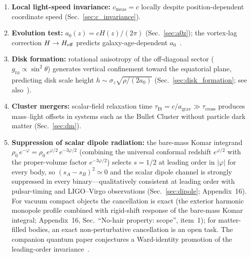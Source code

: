 \documentclass[aps,prd,onecolumn,superscriptaddress,nofootinbib,showpacs,12pt]{revtex4-2}
\newcommand{\azero}{a_{0}}
\begin{document}
\begin{enumerate}
\item \textbf{Local light-speed invariance:}
  $c_{\mathrm{meas}}=c$ locally despite
  position-dependent coordinate speed
  (Sec.~\ref{sec:c_invariance}).

\item \textbf{Evolution test:}
  $\azero(z)=cH(z)/(2\pi)$
  (Sec.~\ref{sec:a0z}); the vortex-lag correction
  $H\to H_{\rm eff}$ predicts galaxy-age-dependent
  $\azero$~\cite{Lotishvili2026MOND}.

\item \textbf{Disk formation:}
  rotational anisotropy of the off-diagonal sector
  ($g_{t\phi}\propto\sin^2\theta$)
  generates vertical confinement toward the equatorial plane,
  predicting disk scale height
  $h\sim\sigma_z\sqrt{\rho/(2\azero)}$
  (Sec.~\ref{sec:disk_formation}; see also~\cite{Lotishvili2026MOND}).

\item \textbf{Cluster mergers:}
  scalar-field relaxation time
  $\tau_{\mathrm{IS}}=c/a_{\mathrm{grav}}\gg\tau_{\mathrm{cross}}$
  produces mass--light offsets in systems such as the
  Bullet Cluster without particle dark matter
  (Sec.~\ref{sec:dm}).

\item \textbf{Suppression of scalar dipole radiation:}
  the bare-mass Komar integrand $\rho_0\,e^{-\varphi}
  = \rho_0\,e^{\varphi/2}\,e^{-3\varphi/2}$ (combining
  the universal conformal redshift $e^{\varphi/2}$ with
  the proper-volume factor $e^{-3\varphi/2}$) selects
  $s=1/2$ at leading order in $|\varphi|$ for every
  body, so $(s_A - s_B)^2 \simeq 0$ and the scalar
  dipole channel is strongly suppressed in every
  binary---qualitatively consistent at leading order with
  pulsar-timing and LIGO--Virgo observations
  (Sec.~\ref{sec:dipole};
  Appendix~16).  For vacuum compact objects the
  cancellation is exact (the exterior harmonic monopole
  profile combined with rigid-shift response of the
  bare-mass Komar integral; Appendix~16,
  Sec.~``No-hair property: scope'', item~1);
  for matter-filled bodies, an exact non-perturbative
  cancellation is an open task.  The companion quantum
  paper conjectures a Ward-identity promotion of the
  leading-order invariance~\cite{Lotishvili2026Q}.


\end{enumerate}
\end{document}
